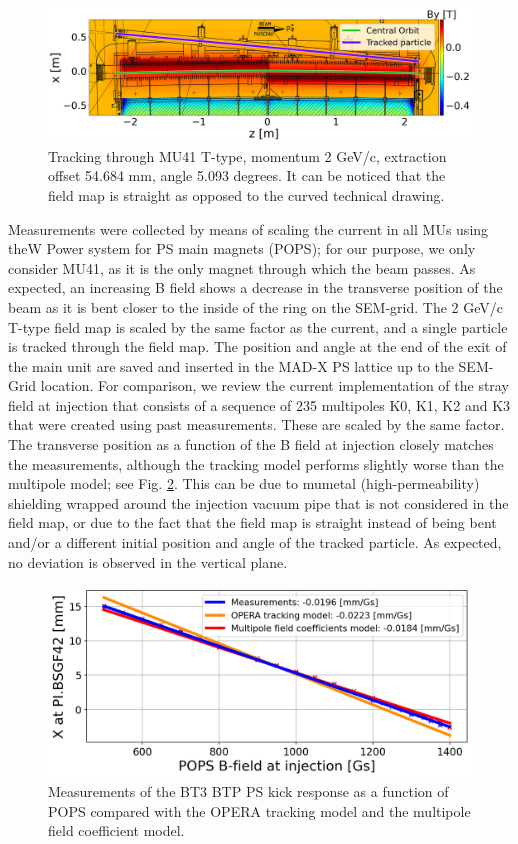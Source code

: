 \documentclass[a4paper,
               biblatex,     %
               keeplastbox,   %
               ]{jacow}
\begin{document}
\begin{figure}[!htb]
   \centering
   \includegraphics*[width=1.0\columnwidth]{MOPOTK030_f5.png}
   \caption{Tracking through MU41 T-type, momentum 2 GeV/c, extraction offset 54.684 mm, angle 5.093 degrees. It can be noticed that the field map is straight as opposed to the curved technical drawing.}
   \label{fig:injection_btp}
\end{figure}
Measurements were collected by means of scaling the current in all MUs using theW Power system for PS main magnets (POPS); for our purpose, we only consider MU41, as it is the only magnet through which the beam passes. As expected, an increasing B field shows a decrease in the transverse position of the beam as it is bent closer to the inside of the ring on the SEM-grid. The 2 GeV/c T-type field map is scaled by the same factor as the current, and a single particle is tracked through the field map. The position and angle at the end of the exit of the main unit are saved and inserted in the MAD-X PS lattice up to the SEM-Grid location. For comparison, we review the current implementation of the stray field at injection that consists of a sequence of 235 multipoles K0, K1, K2 and K3 that were created using past measurements. These are scaled by the same factor. The transverse position as a function of the B field at injection closely matches the measurements, although the tracking model performs slightly worse than the multipole model; see Fig. \ref{fig:injection_btp_transverse_position}. This can be due to mumetal (high-permeability) shielding wrapped around the injection vacuum pipe that is not considered in the field map, or due to the fact that the field map is straight instead of being bent and/or a different initial position and angle of the tracked particle. As expected, no deviation is observed in the vertical plane.

\begin{figure}[!htb]
   \centering
   \includegraphics*[width=1.0\columnwidth]{MOPOTK030_f6.png}
   \caption{Measurements of the BT3 BTP PS kick response as a function of POPS compared with the OPERA tracking model and the multipole field coefficient model.}
   \label{fig:injection_btp_transverse_position}
\end{figure}
\end{document}
